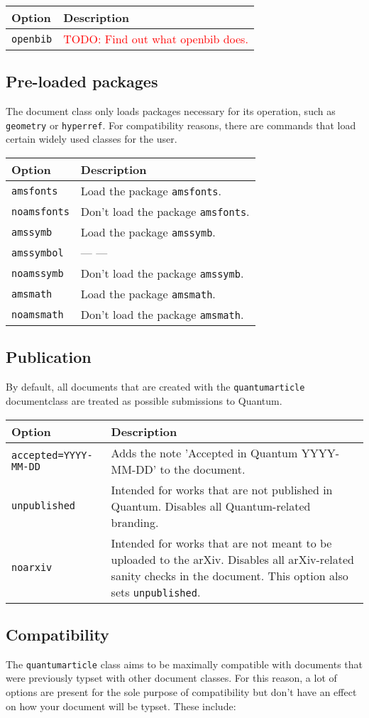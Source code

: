 \documentclass[a4paper,noarxiv,onecolumn]{quantumarticle}
\newcommand{\todo}[1]{\textcolor{red}{TODO: #1}}
\newcommand*{\ditto}{--- \raisebox{-0.5ex}{''} ---}
\newenvironment{options}
	{\medskip\noindent\begin{longtable}{p{.20\columnwidth}p{.744\columnwidth}}
	\textsf{Option} & \textsf{Description} \\
	\midrule
	}
	{\bottomrule\end{longtable}}
\newcommand{\option}[2]{
	\small\texttt{#1} & {\small#2} \\
}
\newcommand{\compatibilityoption}[2]{
	\small\texttt{\textcolor{quantumgray}{#1}} & \small\textcolor{quantumgray}{#2} \\
}
\begin{document}
	\begin{options}
		\option{openbib}{
			\todo{Find out what openbib does.}
		}
	\end{options}

	\subsection{Pre-loaded packages}
	The document class only loads packages necessary for its operation, such as \texttt{geometry} or \texttt{hyperref}. For compatibility reasons, there are commands that load certain widely used classes for the user.
	
	\begin{options}
		\option{amsfonts}{
			Load the package \texttt{amsfonts}.
		}
		\compatibilityoption{noamsfonts}{
			Don't load the package \texttt{amsfonts}.
		}
		\option{amssymb}{
			Load the package \texttt{amssymb}.
		}
		\option{amssymbol}{
			\ditto
		}
		\compatibilityoption{noamssymb}{
			Don't load the package \texttt{amssymb}.
		}
		\option{amsmath}{
			Load the package \texttt{amsmath}.
		}
		\compatibilityoption{noamsmath}{
			Don't load the package \texttt{amsmath}.
		}
	\end{options}

	\subsection{Publication}
	By default, all documents that are created with the \texttt{quantumarticle} documentclass are treated as possible submissions to Quantum. 
	
	\begin{options}
		\option{accepted=YYYY-MM-DD}{
			Adds the note 'Accepted in Quantum YYYY-MM-DD' to the document.
		}
		\option{unpublished}{
			Intended for works that are not published in Quantum. Disables all Quantum-related branding.
		}
		\option{noarxiv}{
			Intended for works that are not meant to be uploaded to the arXiv. Disables all arXiv-related sanity checks in the document. This option also sets \texttt{unpublished}.
		}
	\end{options}

	\subsection{Compatibility}
	The \texttt{quantumarticle} class aims to be maximally compatible with documents that were previously typset with other document classes. For this reason, a lot of options are present for the sole purpose of compatibility but don't have an effect on how your document will be typset. These include:
	
\end{document}
